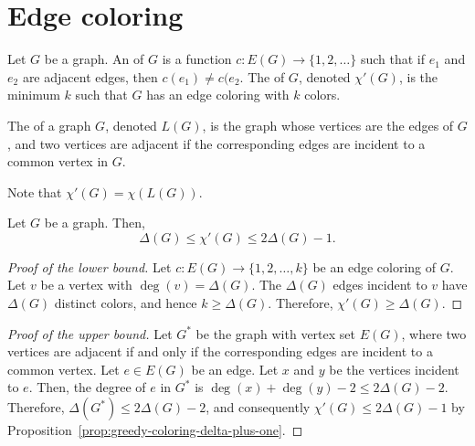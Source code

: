 \section{Edge coloring}

\begin{definition}
    Let \(G\) be a graph.
    An  of \(G\) is a function
    \(
        c \colon E(G) \to \{1, 2, \ldots\}
    \)
    such that if \(e_1\) and \(e_2\) are adjacent edges,
    then \(c(e_1) \neq c(e_2\).
    The  of \(G\),
    denoted \(\chi'(G)\),
    is the minimum \(k\) such that \(G\) has an edge coloring with \(k\) colors.
\end{definition}

\begin{definition}
    The  of a graph \(G\), denoted \(L(G)\), is the graph whose vertices are the edges of \(G\), and two vertices are adjacent if the corresponding edges are incident to a common vertex in \(G\).
\end{definition}

Note that \(\chi'(G) = \chi(L(G))\).

\begin{proposition} \label{prop:easy-bounds-edge-coloring}
    Let \(G\) be a graph.
    Then,
    \begin{equation}
        \Delta(G) \leq \chi'(G) \leq 2\Delta(G) - 1.
    \end{equation}
\end{proposition}

\begin{proof}[Proof of the lower bound]
    Let \(c \colon E(G) \to \{1, 2, \ldots, k\}\) be an edge coloring of \(G\).
    Let \(v\) be a vertex with \(\deg(v) = \Delta(G)\).
    The \(\Delta(G)\) edges incident to \(v\) have \(\Delta(G)\) distinct colors,
    and hence \(k \geq \Delta(G)\).
    Therefore, \(\chi'(G) \geq \Delta(G)\).
\end{proof}

\begin{proof}[Proof of the upper bound]
    Let \(G^*\) be the graph with vertex set \(E(G)\),
    where two vertices are adjacent if and only if the corresponding edges are incident to a common vertex.
    Let \(e \in E(G)\) be an edge.
    Let \(x\) and \(y\) be the vertices incident to \(e\).
    Then, the degree of \(e\) in \(G^*\) is \(\deg(x) + \deg(y) - 2 \leq 2\Delta(G) - 2\).
    Therefore, \(\Delta(G^*) \leq 2\Delta(G) - 2\),
    and consequently \(\chi'(G) \leq 2\Delta(G) - 1\) by Proposition~\ref{prop:greedy-coloring-delta-plus-one}.
\end{proof}


